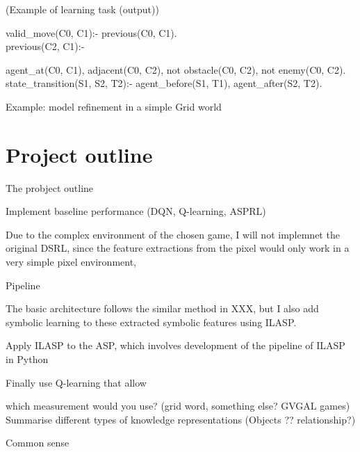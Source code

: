 \documentclass[12pt,twoside]{report}
\begin{document}
\begin{examp} (Example of learning task (output))

valid\_move(C0, C1):- previous(C0, C1).
\\
previous(C2, C1):-

agent\_at(C0, C1),
adjacent(C0, C2),
not obstacle(C0, C2),
not enemy(C0, C2).
\\
state\_transition(S1, S2, T2):-
  agent\_before(S1, T1),
  agent\_after(S2, T2).

\end{examp}
\label{limitation_brave}


Example: model refinement in a simple Grid world



\section{Project outline}

The probject outline

Implement baseline performance (DQN, Q-learning, ASPRL)

Due to the complex environment of the chosen game, I will not implemnet the original DSRL, since the feature extractions from the pixel would only work in a very simple pixel environment,

Pipeline

The basic architecture follows the similar method in XXX, but I also add symbolic learning to these extracted symbolic features using ILASP.

Apply ILASP to the ASP, which involves development of the pipeline of ILASP in Python

Finally use Q-learning that allow

which measurement would you use? (grid word, something else? GVGAL games)
Summarise different types of knowledge representations (Objects ?? relationship?)

Common sense
\end{document}
